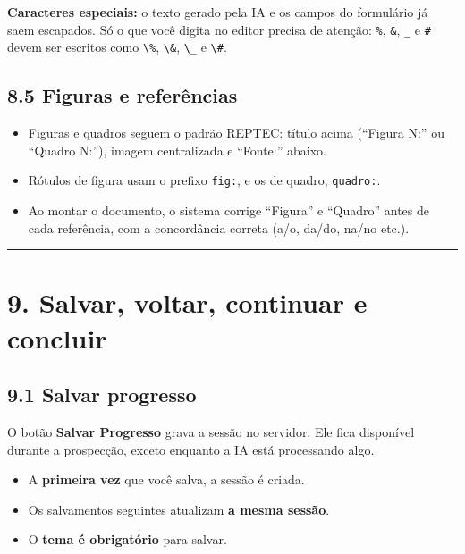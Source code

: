 \documentclass[
  brazilian,
  a4paper,12pt,oneside]{report}
\providecommand{\tightlist}{%
  \setlength{\itemsep}{0pt}\setlength{\parskip}{0pt}}
\begin{document}
\textbf{Caracteres especiais:} o texto gerado pela IA e os campos do
formulário já saem escapados. Só o que você digita no editor precisa de
atenção: \texttt{\%}, \texttt{\&}, \texttt{\_} e \texttt{\#} devem ser
escritos como \texttt{\textbackslash{}\%}, \texttt{\textbackslash{}\&},
\texttt{\textbackslash{}\_} e \texttt{\textbackslash{}\#}.

\section{8.5 Figuras e referências}\label{figuras-e-referuxeancias}

\begin{itemize}
\tightlist
\item
  Figuras e quadros seguem o padrão REPTEC: título acima (``Figura N:''
  ou ``Quadro N:''), imagem centralizada e ``Fonte:'' abaixo.
\item
  Rótulos de figura usam o prefixo \texttt{fig:}, e os de quadro,
  \texttt{quadro:}.
\item
  Ao montar o documento, o sistema corrige ``Figura'' e ``Quadro'' antes
  de cada referência, com a concordância correta (a/o, da/do, na/no
  etc.).
\end{itemize}

\begin{center}\rule{0.5\linewidth}{0.5pt}\end{center}

\chapter{9. Salvar, voltar, continuar e
concluir}\label{salvar-voltar-continuar-e-concluir}

\section{9.1 Salvar progresso}\label{salvar-progresso}

O botão \textbf{Salvar Progresso} grava a sessão no servidor. Ele fica
disponível durante a prospecção, exceto enquanto a IA está processando
algo.

\begin{itemize}
\tightlist
\item
  A \textbf{primeira vez} que você salva, a sessão é criada.
\item
  Os salvamentos seguintes atualizam \textbf{a mesma sessão}.
\item
  O \textbf{tema é obrigatório} para salvar.
\end{itemize}
\end{document}
